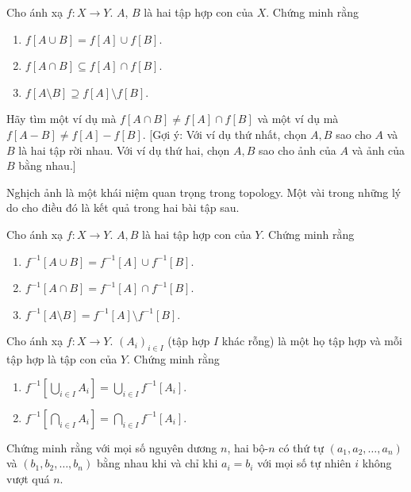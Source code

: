 \begin{exercise}
    Cho ánh xạ $f: X\to Y$. $A$, $B$ là hai tập hợp con của $X$. Chứng minh rằng
    \begin{enumerate}[label={(\roman*)}]
        \item $f[A\cup B] = f[A]\cup f[B]$.
        \item $f[A\cap B] \subseteq f[A]\cap f[B]$.
        \item $f[A \setminus B] \supseteq f[A] \setminus f[B]$.
    \end{enumerate}

    Hãy tìm một ví dụ mà $f[A\cap B]\ne f[A]\cap f[B]$ và một ví dụ mà $f[A - B]\ne f[A] - f[B]$. [Gợi ý: Với ví dụ thứ nhất, chọn $A, B$ sao cho $A$ và $B$ là hai tập rời nhau. Với ví dụ thứ hai, chọn $A, B$ sao cho ảnh của $A$ và ảnh của $B$ bằng nhau.]
\end{exercise}

Nghịch ảnh là một khái niệm quan trọng trong topology. Một vài trong những lý do cho điều đó là kết quả trong hai bài tập sau.

\begin{exercise}
    Cho ánh xạ $f: X\to Y$. $A, B$ là hai tập hợp con của $Y$. Chứng minh rằng
    \begin{enumerate}[label={(\roman*)}]
        \item $f^{-1}[A\cup B] = f^{-1}[A]\cup f^{-1}[B]$.
        \item $f^{-1}[A\cap B] = f^{-1}[A]\cap f^{-1}[B]$.
        \item $f^{-1}[A \setminus B] = f^{-1}[A] \setminus f^{-1}[B]$.
    \end{enumerate}
\end{exercise}

\begin{exercise}
    Cho ánh xạ $f: X\to Y$. ${(A_{i})}_{i\in I}$ (tập hợp $I$ khác rỗng) là một họ tập hợp và mỗi tập hợp là tập con của $Y$. Chứng minh rằng
    \begin{enumerate}[label={(\roman*)}]
        \item $f^{-1}[\bigcup_{i\in I}A_{i}] = \bigcup_{i\in I} f^{-1}[A_{i}]$.
        \item $f^{-1}[\bigcap_{i\in I}A_{i}] = \bigcap_{i\in I} f^{-1}[A_{i}]$.
    \end{enumerate}
\end{exercise}

\begin{exercise}
    Chứng minh rằng với mọi số nguyên dương $n$, hai bộ-$n$ có thứ tự $(a_{1}, a_{2}, \ldots, a_{n})$ và $(b_{1}, b_{2}, \ldots, b_{n})$ bằng nhau khi và chỉ khi $a_{i} = b_{i}$ với mọi số tự nhiên $i$ không vượt quá $n$.
\end{exercise}

